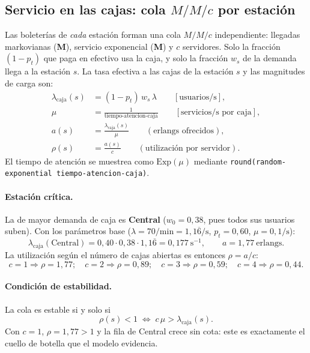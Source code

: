 \documentclass[11pt,a4paper]{article}
\newcommand{\code}[1]{\texttt{#1}}
\begin{document}
\subsection{Servicio en las cajas: cola \texorpdfstring{$M/M/c$}{M/M/c} por estación}
Las boleterías de \emph{cada} estación forman una cola $M/M/c$ independiente:
llegadas markovianas (\textbf{M}), servicio exponencial (\textbf{M}) y $c$
servidores. Solo la fracción $(1-p_t)$ que paga en efectivo usa la caja, y solo la
fracción $w_s$ de la demanda llega a la estación $s$. La tasa efectiva a las cajas de
la estación $s$ y las magnitudes de carga son:
\begin{align}
\lambda_{\text{caja}}(s) &= (1-p_t)\,w_s\,\lambda \qquad [\text{usuarios/s}], \\
\mu &= \frac{1}{\text{tiempo-atencion-caja}} \qquad [\text{servicios/s por caja}], \\
a(s) &= \frac{\lambda_{\text{caja}}(s)}{\mu} \qquad (\text{erlangs ofrecidos}), \\
\rho(s) &= \frac{a(s)}{c} \qquad (\text{utilización por servidor}).
\end{align}
El tiempo de atención se muestrea como $\mathrm{Exp}(\mu)$ mediante
\code{round(random-exponential tiempo-atencion-caja)}.

\paragraph{Estación crítica.} La de mayor demanda de caja es \textbf{Central}
($w_0 = 0{,}38$, pues todos sus usuarios suben). Con los parámetros base
($\lambda=70/\text{min}=1{,}1\overline{6}/\text{s}$, $p_t=0{,}60$, $\mu=0{,}1/\text{s}$):
\begin{equation}
\lambda_{\text{caja}}(\text{Central}) = 0{,}40 \cdot 0{,}38 \cdot 1{,}1\overline{6}
= 0{,}177\ \text{s}^{-1},\qquad a = 1{,}77\ \text{erlangs}.
\end{equation}
La utilización según el número de cajas abiertas es entonces
$\rho = a/c$:
\begin{equation}
c=1\Rightarrow \rho = 1{,}77;\quad
c=2\Rightarrow \rho = 0{,}89;\quad
c=3\Rightarrow \rho = 0{,}59;\quad
c=4\Rightarrow \rho = 0{,}44.
\end{equation}

\paragraph{Condición de estabilidad.} La cola es estable si y solo si
\begin{equation}
\rho(s) < 1 \;\Longleftrightarrow\; c\,\mu > \lambda_{\text{caja}}(s).
\end{equation}
Con $c=1$, $\rho=1{,}77>1$ y la fila de Central crece sin cota: este es exactamente
el cuello de botella que el modelo evidencia.
\end{document}
